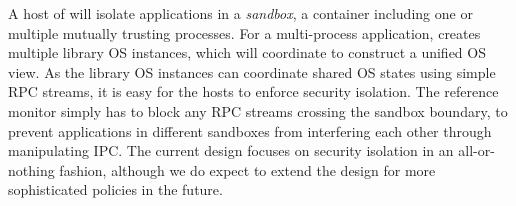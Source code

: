 


A host of \graphene{} will isolate applications in a {\em sandbox}, a container including one or multiple mutually trusting processes.
For a multi-process application, \graphene{} creates multiple library OS instances,
which will coordinate to construct a unified OS view.
As the library OS instances can coordinate shared OS states using simple RPC streams,
it is easy for the hosts to enforce security isolation.
The reference monitor simply has to block any RPC streams crossing the sandbox boundary,
to prevent applications in different sandboxes from interfering each other through manipulating IPC.
The current design focuses on security isolation in an all-or-nothing fashion, although we do expect to extend the design for more sophisticated policies
in the future.

